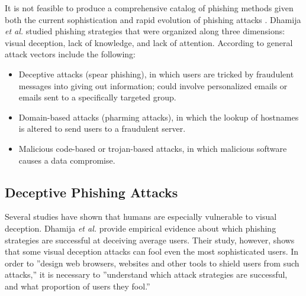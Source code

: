 \documentclass[english,gradu]{tktltiki}
\begin{document}
              It is not feasible to produce a comprehensive catalog of phishing methods given both the current sophistication and rapid evolution of phishing attacks \cite{phishing_attacks_and_solutions_2007}. Dhamija
          \emph{et al.} \cite{why_phishing_works_06} studied phishing strategies that were organized along three dimensions: visual deception, lack of knowledge, and lack of attention. According to \cite{phishing_attacks_and_solutions_2007, suspectibility_to_phishing_2006} general attack vectors include the following:

          \begin{itemize}

            \item{Deceptive attacks (spear phishing),
                      in which users are tricked by fraudulent messages into giving out
                      information; could involve personalized emails or emails sent to a specifically
                      targeted group.
                    }

            \item{Domain-based attacks (pharming attacks),
                      in which the lookup of hostnames is altered to send users to a
                      fraudulent server.
                    }

            \item{Malicious code-based or trojan-based attacks,
                        in which malicious software causes a data compromise.
                    }

          \end{itemize}



\subsection{Deceptive Phishing Attacks} %
\label{sub:deceptive_phishing_attacks}

             \label{sec:visual_deception}

              Several studies have shown \cite{visual_similarity_phishing_2008, why_phishing_works_06, suspectibility_to_phishing_2006} that humans are especially vulnerable to visual deception. Dhamija \emph{et al.} \cite{why_phishing_works_06} provide empirical evidence about which phishing strategies are successful at deceiving average users. Their study, however, shows that some visual deception attacks can fool even the most sophisticated users. In order to ''design web browsers, websites and other tools to shield users from such attacks,'' it is necessary to ''understand which attack strategies are successful, and what proportion of users they fool.'' \cite{why_phishing_works_06}
\end{document}
